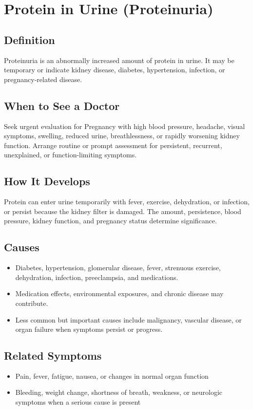 \chapter{Protein in Urine (Proteinuria)}

\section*{Definition}
Proteinuria is an abnormally increased amount of protein in urine. It may be temporary or indicate kidney disease, diabetes, hypertension, infection, or pregnancy-related disease.

\section*{When to See a Doctor}
Seek urgent evaluation for Pregnancy with high blood pressure, headache, visual symptoms, swelling, reduced urine, breathlessness, or rapidly worsening kidney function. Arrange routine or prompt assessment for persistent, recurrent, unexplained, or function-limiting symptoms.

\section*{How It Develops}
Protein can enter urine temporarily with fever, exercise, dehydration, or infection, or persist because the kidney filter is damaged. The amount, persistence, blood pressure, kidney function, and pregnancy status determine significance.

\section*{Causes}
\begin{itemize}
  \item Diabetes, hypertension, glomerular disease, fever, strenuous exercise, dehydration, infection, preeclampsia, and medications.
  \item Medication effects, environmental exposures, and chronic disease may contribute.
  \item Less common but important causes include malignancy, vascular disease, or organ failure when symptoms persist or progress.
\end{itemize}

\section*{Related Symptoms}
\begin{itemize}
  \item Pain, fever, fatigue, nausea, or changes in normal organ function
  \item Bleeding, weight change, shortness of breath, weakness, or neurologic symptoms when a serious cause is present
\end{itemize}

